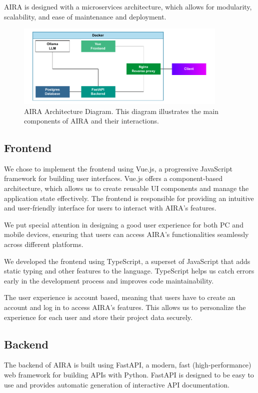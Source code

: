 AIRA is designed with a microservices architecture,
which allows for modularity, scalability, and ease of
maintenance and deployment.

\begin{figure}[H]
    \centering
    \includegraphics[width=0.9\textwidth]{figures/architecture.drawio.pdf}
    \caption{AIRA Architecture Diagram. This diagram
    illustrates the main components of AIRA and their
    interactions.}
    \label{fig:architecture}
\end{figure}

\subsection{Frontend}
We chose to implement the frontend using Vue.js, a
progressive JavaScript framework for building user
interfaces. Vue.js offers a component-based architecture,
which allows us to create reusable UI components and
manage the application state effectively. The frontend
is responsible for providing an intuitive and user-friendly
interface for users to interact with AIRA's features.

We put special attention in designing a good user experience
for both PC and mobile devices, ensuring that users can
access AIRA's functionalities seamlessly across different
platforms.

We developed the frontend using TypeScript, a
superset of JavaScript that adds static typing and
other features to the language. TypeScript helps us
catch errors early in the development process and
improves code maintainability.

The user experience is account based, meaning that users
have to create an account and log in to access AIRA's
features. This allows us to personalize the experience
for each user and store their project data securely.

\subsection{Backend}
The backend of AIRA is built using FastAPI, a modern,
fast (high-performance) web framework for building APIs
with Python. FastAPI is designed to be easy to use
and provides automatic generation of interactive API
documentation.

